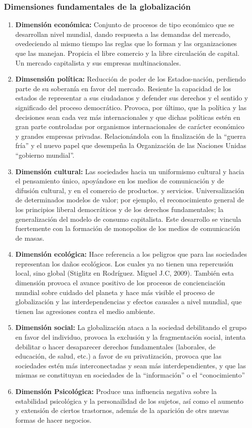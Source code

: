 \subsubsection{Dimensiones fundamentales de la globalización}
\begin{enumerate}
    \item \textbf{Dimensión económica:} Conjunto de procesos de tipo económico que se desarrollan nivel mundial, dando respuesta a las demandas del mercado, ovedeciendo al mismo tiempo las reglas que lo forman y las organizaciones que las manejan. Propicia el libre comercio y la libre circulación de capital. Un mercado capitalista y sus empresas multinacionales.
    \item \textbf{Dimsensión política:} Reducción de poder de los Estados-nación, perdiendo parte de su soberanía en favor del mercado. Resiente la capacidad de los estados de representar a sus ciudadanos y defender sus derechos y el sentido y significado del proceso democrático. Provoca, por último, que la política y las decisiones sean cada vez más internacionales y que dichas políticas estén en gran parte controladas por organismos internacionales de carácter económico y grandes empresas privadas. Relacionándola con la finalización de la ``guerra fría'' y el nuevo papel que desempeña la Organización de las Naciones Unidas ``gobierno mundial''.
    \item \textbf{Dimensión cultural:} Las sociedades hacia un uniformismo cultural y hacia el pensamiento único, apoyándose en los medios de comunicación y de difusión cultural, y en el comercio de productos. y servicios. Universalización de determinados modelos de valor; por ejemplo, el reconocimiento general de los principios liberal democráticos y de los derechos fundamentales; la generalización del modelo de consumo capitalista. Este desarrollo se vincula fuertemente con la formación de monopolios de los medios de comunicación de masas.
    \item \textbf{Dimensión ecológica:} Hace referencia a los peligros que para las sociedades representan los daños ecológicos. Los cuales ya no tienen una repercusión local, sino global (Stiglitz en Rodríguez. Miguel J.C, 2009). También esta dimensión provoca el avance positivo de los procesos de concienciación mundial sobre cuidado del planeta y hace más visible el proceso de globalización y las interdependencias y efectos causales a nivel mundial, que tienen las agresiones contra el medio ambiente.
    \item \textbf{Dimensión social:} La globalización ataca a la sociedad debilitando el grupo en favor del individuo, provoca la exclusión y la fragmentación social, intenta debilitar o hacer desaparecer derechos fundamentales (laborales, de educación, de salud, etc.) a favor de su privatización, provoca que las sociedades estén más interconectadas y sean más interdependientes, y que las mismas se constituyan en sociedades de la ``información'' o el ``conocimiento''
    \item \textbf{Dimensión Psicológica:} Produce una influencia negativa sobre la estabilidad psicológica y la personailidad de los sujetos, así como el aumento y extensión de ciertos trastornos, además de la aparición de otrs nuevas formas de hacer negocios.
\end{enumerate}
